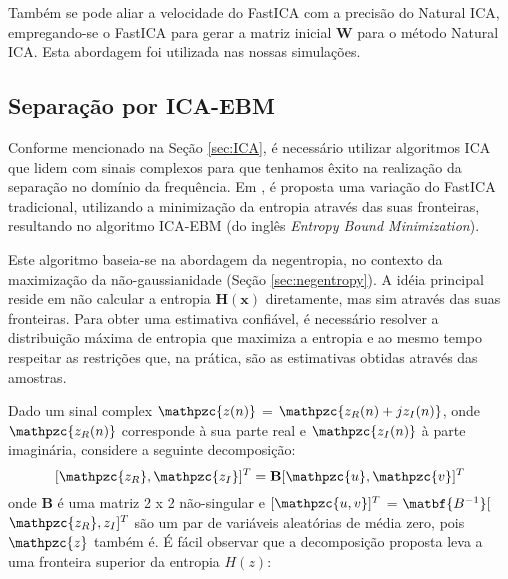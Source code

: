         Também se pode aliar a velocidade do FastICA com a precisão do Natural ICA, empregando-se o FastICA para gerar a matriz inicial $\mathbf{W}$ para o método Natural ICA. Esta abordagem foi utilizada nas nossas simulações.
    
    \subsection{Separação por ICA-EBM}
        
    Conforme mencionado na Seção \ref{sec:ICA}, é necessário utilizar algoritmos ICA que lidem com sinais complexos para que tenhamos êxito na realização da separação no domínio da frequência. Em \cite{fasticaebm}, é proposta uma variação do FastICA tradicional, utilizando a minimização da entropia através das suas fronteiras, resultando no algoritmo ICA-EBM (do inglês \textit{Entropy Bound Minimization}).
        
    Este algoritmo baseia-se na abordagem da negentropia, no contexto da maximização da não-gaussianidade (Seção \ref{sec:negentropy}). A idéia principal reside em não calcular a entropia $\mathbf{H(x)}$ diretamente, mas sim através das suas fronteiras. Para obter uma estimativa confiável, é necessário resolver a distribuição máxima de entropia que maximiza a entropia e ao mesmo tempo respeitar as restrições que, na prática, são as estimativas obtidas através das amostras. 
        
    Dado um sinal complex $\mathpzc{z(n)}$ = $\mathpzc{z_R(n) + jz_I(n)}$, onde $\mathpzc{z_R(n)}$ corresponde à sua parte real e $\mathpzc{z_I(n)}$ à parte imaginária, considere a seguinte decomposição:
    \begin{equation}
        \label{eq:decomposition1}
            [\mathpzc{z_R}, \mathpzc{z_I}]^T =
            \mathbf{B}[\mathpzc{u},\mathpzc{v}]^T
    \end{equation}
    onde $\mathbf{B}$ é uma matriz 2 x 2 não-singular e $[\mathpzc{u,v}]^T$ = $\matbf{B^{-1}}[$ $\mathpzc{z_R},{z_I}]^T$ são um par de variáveis aleatórias de média zero, pois $\mathpzc{z}$ também é. É fácil observar que a decomposição proposta leva a uma fronteira superior da entropia ${H(z)}$\cite{entropy}:
        
